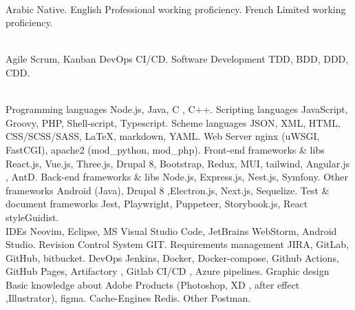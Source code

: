 


\begin{cvskills}
    \\
  \cvskill
    {Arabic}
    {Native.}
  \cvskill
    {English}
    {Professional working proficiency.}
  \cvskill
    {French}
    {Limited working proficiency.}


  \\

  \cvskill
    {Agile}
    {Scrum, Kanban}
  \cvskill
    {DevOps}
    {CI/CD.}
  \cvskill
    {Software Development}
    {TDD, BDD, DDD, CDD.}

  \\

  \cvskill
    {Programming languages}
    {Node.js, Java, C , C++.}
  \cvskill
    {Scripting languages}
    {JavaScript, Groovy, PHP, Shell-script, Typescript.}
  \cvskill
    {Scheme languages}
    {JSON, XML, HTML, CSS/SCSS/SASS, LaTeX, markdown, YAML.}
  \cvskill
    {Web Server}
    {nginx (uWSGI, FastCGI), apache2 (mod\_python, mod\_php).}
  \cvskill
    {Front-end frameworks \& libs}
    {React.js, Vue.js, Three.js, Drupal 8, Bootstrap, Redux, MUI, tailwind, Angular.js , AntD.}
  \cvskill
    {Back-end frameworks \& libs}
    {Node.js, Express.js, Nest.js, Symfony.}
  \cvskill
    {Other frameworks}
    {Android (Java), Drupal 8 ,Electron.js, Next.js, Sequelize.}
  \cvskill
    {Test \& document frameworks}
    {Jest, Playwright, Puppeteer, Storybook.js, React styleGuidist.}
  \\

    \cvskill
      {IDEs}
      {Neovim, Eclipse, MS Visual Studio Code, JetBrains WebStorm, Android Studio.}
    \cvskill
      {Revision Control System}
      {GIT.}
    \cvskill
      {Requirements management}
      {JIRA, GitLab, GitHub, bitbucket.}
    \cvskill
      {DevOps}
      {Jenkins, Docker, Docker-compose, Github Actions, GitHub Pages, Artifactory , Gitlab CI/CD , Azure
       \newline pipelines.}
    \cvskill
      {Graphic design}
      {Basic knowledge about Adobe Products (Photoshop, XD , after effect ,Illustrator), figma.}
    \cvskill
      {Cache-Engines}
      {Redis.}
    \cvskill
      {Other}
      {Postman.}


\end{cvskills}
